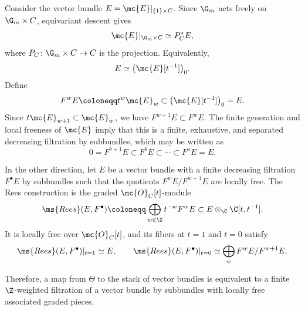 \begin{rmk}
    Consider the vector bundle \(E=\mc{E}|_{\{1\}\times C}\). Since \(\G_m\) acts freely on \(\G_m\times C\), equivariant descent gives
    \[
        \mc{E}|_{\G_m\times C}\simeq P_C^*E,
    \]
    where \(P_C\colon\G_m\times C\to C\) is the projection. Equivalently,
    \[
        E\simeq\big(\mc{E}[t^{-1}]\big)_0.
    \]
    Define
    \[
        F^wE\coloneqq t^w\mc{E}_w\subset\big(\mc{E}[t^{-1}]\big)_0=E.
    \]
    Since \(t\mc{E}_{w+1}\subset\mc{E}_w\), we have \(F^{w+1}E\subset F^wE\). The finite generation and local freeness of \(\mc{E}\) imply that this is a finite, exhaustive, and separated decreasing filtration by subbundles, which may be written as
    \[
        0=F^{b+1}E\subset F^bE\subset\cdots\subset F^aE=E.
    \]

    In the other direction, let \(E\) be a vector bundle with a finite decreasing filtration \(F^\bullet E\) by subbundles such that the quotients \(F^wE/F^{w+1}E\) are locally free. The Rees construction is the graded \(\mc{O}_C[t]\)-module
    \[
        \ms{Rees}(E,F^\bullet)
        \coloneqq
        \bigoplus_{w\in\Z}t^{-w}F^wE
        \subset
        E\otimes_{\C}\C[t,t^{-1}].
    \]
    It is locally free over \(\mc{O}_C[t]\), and its fibers at \(t=1\) and \(t=0\) satisfy
    \[
        \ms{Rees}(E,F^\bullet)|_{t=1}\simeq E,
        \qquad
        \ms{Rees}(E,F^\bullet)|_{t=0}
        \simeq
        \bigoplus_w F^wE/F^{w+1}E.
    \]
\end{rmk}

Therefore, a map from \(\Theta\) to the stack of vector bundles is equivalent to a finite \(\Z\)-weighted filtration of a vector bundle by subbundles with locally free associated graded pieces.


